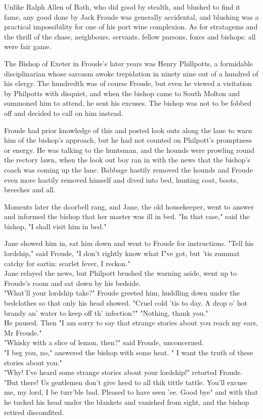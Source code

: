 \Flourish


Unlike Ralph Allen of Bath, who did good by stealth, and blushed to find it fame, any good done by Jack Froude was generally accidental, and blushing was a practical impossibility for one of his port wine complexion. As for stratagems and the thrill of the chase, neighbours, servants, fellow parsons, foxes and bishops: all were fair game.

The Bishop of Exeter in Froude's later years was Henry Phillpotts, a formidable disciplinarian whose sarcasm awoke trepidation in ninety nine out of a hundred of his clergy. The hundredth was of course Froude, but even he viewed a visitation by Philpotts with disquiet, and when the bishop came to South Molton and summoned him to attend, he sent his excuses. The bishop was not to be fobbed off and decided to call on him instead.

Froude had prior knowledge of this and posted look outs along the lane to warn him of the bishop's approach, but he had not counted on Philpott's promptness or energy. He was talking to the huntsman, and the hounds were prowling round the rectory lawn, when the look out boy ran in with the news that the bishop's coach was coming up the lane. Babbage hastily removed the hounds and Froude even more hastily removed himself and dived into bed, hunting coat, boots, breeches and all.

Moments later the doorbell rang, and Jane, the old housekeeper, went to answer and informed the bishop that her master was ill in bed. "In that case," said the bishop, "I shall visit him in bed."

Jane showed him in, sat him down and went to Froude for instructions.
 "Tell his lordship," said Froude, "I don't rightly know what I"ve got, but 'tis zummat catchy for sartin:  scarlet fever, I reckon."\\
 Jane relayed the news, but Philpott brushed the warning aside, went up to Froude's room and sat down by his bedside.\\
 "What'll your lordship take?" Froude greeted him, huddling down under the bedclothes so that only his head showed. "Cruel cold 'tis to day. A drop o' hot brandy an' water to keep off th' infection?"
 "Nothing, thank you."\\
 He paused. Then   "I am sorry to say that strange stories about you reach my ears, Mr Froude."\\
 "Whisky with a slice of lemon, then?" said Froude, unconcerned.\\
 "I beg you, no," answered the bishop with some heat. " I want the truth of these stories about you."\\
 "Why! I've heard some strange stories about your lordship!" retorted Froude. "But there! Us gentlemen don't give heed to all thik tittle tattle.   You'll excuse me, my lord, I be turr'ble bad. Pleased to have seen 'ee. Good bye"   and with that he tucked his head under the blankets and vanished from sight, and the bishop retired discomfited.

